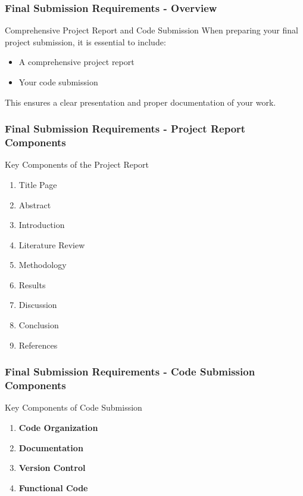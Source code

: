 \documentclass[aspectratio=169]{beamer}
\begin{document}
\begin{frame}[fragile]
    \frametitle{Final Submission Requirements - Overview}
    \begin{block}{Comprehensive Project Report and Code Submission}
        When preparing your final project submission, it is essential to include:
        \begin{itemize}
            \item A comprehensive project report
            \item Your code submission
        \end{itemize}
        This ensures a clear presentation and proper documentation of your work.
    \end{block}
\end{frame}

\begin{frame}[fragile]
    \frametitle{Final Submission Requirements - Project Report Components}
    \begin{block}{Key Components of the Project Report}
        \begin{enumerate}
            \item Title Page
            \item Abstract
            \item Introduction
            \item Literature Review
            \item Methodology
            \item Results
            \item Discussion
            \item Conclusion
            \item References
        \end{enumerate}
    \end{block}
\end{frame}

\begin{frame}[fragile]
    \frametitle{Final Submission Requirements - Code Submission Components}
    \begin{block}{Key Components of Code Submission}
        \begin{enumerate}
            \item \textbf{Code Organization}
            \item \textbf{Documentation}
            \item \textbf{Version Control}
            \item \textbf{Functional Code}
        \end{enumerate}
    \end{block}
\end{frame}
\end{document}
